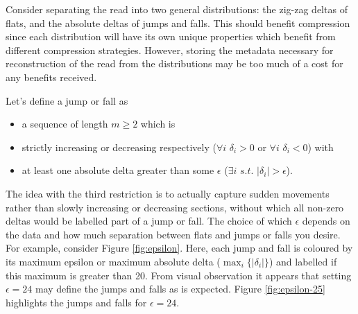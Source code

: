 Consider separating the read into two general distributions: the zig-zag deltas
of flats, and the absolute deltas of jumps and falls. This should benefit
compression since each distribution will have its own unique properties which
benefit from different compression strategies. However, storing the metadata
necessary for reconstruction of the read from the distributions may be too much
of a cost for any benefits received.

Let's define a jump or fall as
\begin{itemize}
	\item a sequence of length $m\ge 2$ which is
	\item strictly increasing or decreasing respectively ($\forall i$ $\delta_i>0$ or $\forall i$ $\delta_i < 0$) with
	\item at least one absolute delta greater than some $\epsilon$ ($\exists i$ $s.t.$ $|\delta_i|>\epsilon$).
\end{itemize}

The idea with the third restriction is to actually capture sudden movements
rather than slowly increasing or decreasing sections, without which all non-zero
deltas would be labelled part of a jump or fall. The choice of which $\epsilon$
depends on the data and how much separation between flats and jumps or falls you
desire. For example, consider Figure \ref{fig:epsilon}. Here, each jump and fall
is coloured by its maximum epsilon or maximum absolute delta
($\max_i\{|\delta_i|\}$) and labelled if this maximum is greater than 20. From
visual observation it appears that setting $\epsilon=24$ may define the jumps
and falls as is expected. Figure \ref{fig:epsilon-25} highlights the jumps and
falls for $\epsilon=24$.



